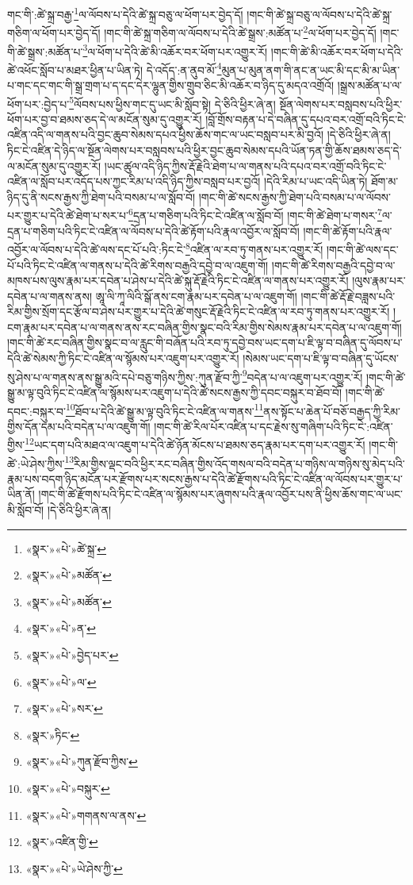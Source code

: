 གང་གི་:ཚེ་སྐྲ་བརྒྱ་\footnote{«སྣར་»«པེ་»ཚེ་སྐྲ་}ལ་ལོབས་པ་དེའི་ཚེ་སྐྲ་བཅུ་ལ་ཕོག་པར་བྱེད་དོ། །གང་གི་ཚེ་སྐྲ་བཅུ་ལ་ལོབས་པ་དེའི་ཚེ་སྐྲ་གཅིག་ལ་ཕོག་པར་བྱེད་དོ། །གང་གི་ཚེ་སྐྲ་གཅིག་ལ་ལོབས་པ་དེའི་ཚེ་སྒྲས་:མཚོན་པ་\footnote{«སྣར་»«པེ་»མཚོན་}ལ་ཕོག་པར་བྱེད་དོ། །གང་གི་ཚེ་སྒྲས་:མཚོན་པ་\footnote{«སྣར་»«པེ་»མཚོན་}ལ་ཕོག་པ་དེའི་ཚེ་མི་འཆོར་བར་ཕོག་པར་འགྱུར་རོ། །གང་གི་ཚེ་མི་འཆོར་བར་ཕོག་པ་དེའི་ཚེ་འཕོང་སློབ་པ་མཐར་ཕྱིན་པ་ཡིན་ཏེ། དེ་འདོད་:ན་ནུབ་མོ་\footnote{«སྣར་»«པེ་»ན་}མུན་པ་མུན་ནག་གི་ནང་ན་ཡང་མི་དང་མི་མ་ཡིན་པ་གང་དང་གང་གི་སྒྲ་གྲག་པ་ད་དང་དེར་ལྷུན་གྱིས་གྲུབ་ཅིང་མི་འཆོར་བ་ཉིད་དུ་མདའ་འགྲོའོ། །སྒྲས་མཚོན་པ་ལ་ཕོག་པར་:བྱེད་པ་\footnote{«སྣར་»«པེ་»བྱེད་པར་}ལོབས་པས་ཕྱིས་གང་དུ་ཡང་མི་སློབ་སྟེ། དེ་ཅིའི་ཕྱིར་ཞེ་ན། སྔོན་ལེགས་པར་བསླབས་པའི་ཕྱིར་ཕོག་པར་བྱ་བ་ཐམས་ཅད་དེ་ལ་མངོན་སུམ་དུ་འགྱུར་རོ། །བློ་གྲོས་བརྟན་པ་དེ་བཞིན་དུ་དཔའ་བར་འགྲོ་བའི་ཏིང་ངེ་འཛིན་འདི་ལ་གནས་པའི་བྱང་ཆུབ་སེམས་དཔའ་ཕྱིས་ཆོས་གང་ལ་ཡང་བསླབ་པར་མི་བྱའོ། །དེ་ཅིའི་ཕྱིར་ཞེ་ན། ཏིང་ངེ་འཛིན་དེ་ཉིད་ལ་སྔོན་ལེགས་པར་བསླབས་པའི་ཕྱིར་བྱང་ཆུབ་སེམས་དཔའི་ཡོན་ཏན་གྱི་ཆོས་ཐམས་ཅད་དེ་ལ་མངོན་སུམ་དུ་འགྱུར་རོ། །ཡང་ཚུལ་འདི་ཉིད་ཀྱིས་རྡོ་རྗེའི་ཐེག་པ་ལ་གནས་པའི་དཔའ་བར་འགྲོ་བའི་ཏིང་ངེ་འཛིན་ལ་སློབ་པར་འདོད་པས་ཀྱང་རིམ་པ་འདི་ཉིད་ཀྱིས་བསླབ་པར་བྱའོ། །དེའི་རིམ་པ་ཡང་འདི་ཡིན་ཏེ། ཐོག་མ་ཉིད་དུ་ནི་སངས་རྒྱས་ཀྱི་ཐེག་པའི་བསམ་པ་ལ་སློབ་བོ། །གང་གི་ཚེ་སངས་རྒྱས་ཀྱི་ཐེག་པའི་བསམ་པ་ལ་ལོབས་པར་གྱུར་པ་དེའི་ཚེ་ཐེག་པ་སར་པ་\footnote{«སྣར་»«པེ་»ལ་}དྲན་པ་གཅིག་པའི་ཏིང་ངེ་འཛིན་ལ་སློབ་བོ། །གང་གི་ཚེ་ཐེག་པ་གསར་\footnote{«སྣར་»«པེ་»སར་}ལ་དྲན་པ་གཅིག་པའི་ཏིང་ངེ་འཛིན་ལ་ལོབས་པ་དེའི་ཚེ་རྟོག་པའི་རྣལ་འབྱོར་ལ་སློབ་བོ། །གང་གི་ཚེ་རྟོག་པའི་རྣལ་འབྱོར་ལ་ལོབས་པ་དེའི་ཚེ་ལས་དང་པོ་པའི་:ཏིང་ངེ་\footnote{«སྣར་»ཏིང་}འཛིན་ལ་རབ་ཏུ་གནས་པར་འགྱུར་རོ། །གང་གི་ཚེ་ལས་དང་པོ་པའི་ཏིང་ངེ་འཛིན་ལ་གནས་པ་དེའི་ཚེ་རིགས་བརྒྱའི་དབྱེ་བ་ལ་འཇུག་གོ། །གང་གི་ཚེ་རིགས་བརྒྱའི་དབྱེ་བ་ལ་མཁས་པས་ལུས་རྣམ་པར་དབེན་པ་ཤེས་པ་དེའི་ཚེ་སྐུ་རྡོ་རྗེའི་ཏིང་ངེ་འཛིན་ལ་གནས་པར་འགྱུར་རོ། །ལུས་རྣམ་པར་དབེན་པ་ལ་གནས་ནས། ཨཱ་ལི་ཀཱ་ལིའི་སྒོ་ནས་ངག་རྣམ་པར་དབེན་པ་ལ་འཇུག་གོ། །གང་གི་ཚེ་རྡོ་རྗེ་བཟླས་པའི་རིམ་གྱིས་སྲོག་དང་རྩོལ་བ་ཤེས་པར་གྱུར་པ་དེའི་ཚེ་གསུང་རྡོ་རྗེའི་ཏིང་ངེ་འཛིན་ལ་རབ་ཏུ་གནས་པར་འགྱུར་རོ། །ངག་རྣམ་པར་དབེན་པ་ལ་གནས་ནས་རང་བཞིན་གྱིས་སྣང་བའི་རིམ་གྱིས་སེམས་རྣམ་པར་དབེན་པ་ལ་འཇུག་གོ། །གང་གི་ཚེ་རང་བཞིན་གྱིས་སྣང་བ་ལ་རླུང་གི་བཞོན་པའི་རབ་ཏུ་དབྱེ་བས་ཡང་དག་པ་ཇི་ལྟ་བ་བཞིན་དུ་ལོབས་པ་དེའི་ཚེ་སེམས་ཀྱི་ཏིང་ངེ་འཛིན་ལ་སྙོམས་པར་འཇུག་པར་འགྱུར་རོ། །སེམས་ཡང་དག་པ་ཇི་ལྟ་བ་བཞིན་དུ་ཡོངས་སུ་ཤེས་པ་ལ་གནས་ནས་སྒྱུ་མའི་དཔེ་བཅུ་གཉིས་ཀྱིས་:ཀུན་རྫོབ་ཀྱི་\footnote{«སྣར་»«པེ་»ཀུན་རྫོབ་ཀྱིས་}བདེན་པ་ལ་འཇུག་པར་འགྱུར་རོ། །གང་གི་ཚེ་སྒྱུ་མ་ལྟ་བུའི་ཏིང་ངེ་འཛིན་ལ་སྙོམས་པར་འཇུག་པ་དེའི་ཚེ་སངས་རྒྱས་ཀྱི་དབང་བསྐུར་བ་ཐོབ་བོ། །གང་གི་ཚེ་དབང་:བསྐུར་བ་\footnote{«སྣར་»«པེ་»བསྐུར་}ཐོབ་པ་དེའི་ཚེ་སྒྱུ་མ་ལྟ་བུའི་ཏིང་ངེ་འཛིན་ལ་གནས་\footnote{«སྣར་»«པེ་»གགནས་ལ་ནས་}ནས་སྟོང་པ་ཆེན་པོ་བཅོ་བརྒྱད་ཀྱི་རིམ་གྱིས་དོན་དམ་པའི་བདེན་པ་ལ་འཇུག་གོ། །གང་གི་ཚེ་རིལ་པོར་འཛིན་པ་དང་རྗེས་སུ་གཞིག་པའི་ཏིང་ངེ་:འཛིན་གྱིས་\footnote{«སྣར་»འཛིན་གྱི་}ཡང་དག་པའི་མཐའ་ལ་འཇུག་པ་དེའི་ཚེ་ཉོན་མོངས་པ་ཐམས་ཅད་རྣམ་པར་དག་པར་འགྱུར་རོ། །གང་གི་ཚེ་:ཡེ་ཤེས་ཀྱིས་\footnote{«སྣར་»«པེ་»ཡེ་ཤེས་ཀྱི་}རིམ་གྱིས་ལྡང་བའི་ཕྱིར་རང་བཞིན་གྱིས་འོད་གསལ་བའི་བདེན་པ་གཉིས་ལ་གཉིས་སུ་མེད་པའི་རྣམ་པས་བདག་ཉིད་མངོན་པར་རྫོགས་པར་སངས་རྒྱས་པ་དེའི་ཚེ་རྫོགས་པའི་ཏིང་ངེ་འཛིན་ལ་ལོབས་པར་གྱུར་པ་ཡིན་ནོ། །གང་གི་ཚེ་རྫོགས་པའི་ཏིང་ངེ་འཛིན་ལ་སྙོམས་པར་ཞུགས་པའི་རྣལ་འབྱོར་པས་ནི་ཕྱིས་ཆོས་གང་ལ་ཡང་མི་སློབ་བོ། །དེ་ཅིའི་ཕྱིར་ཞེ་ན། 